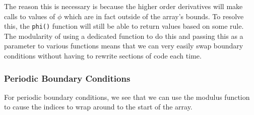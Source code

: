 The reason this is necessary is because the higher order derivatives will make calls to values of $\phi$ which are in fact outside of the array's bounds. To resolve this, the \texttt{phi()} function will still be able to return values based on some rule. The modularity of using a dedicated function to do this and passing this as a parameter to various functions means that we can very easily swap boundary conditions without having to rewrite sections of code each time.



\subsubsection{Periodic Boundary Conditions}

For periodic boundary conditions, we see that we can use the modulus function to cause the indices to wrap around to the start of the array.


